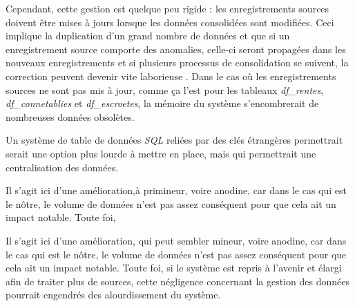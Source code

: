 Cependant, cette gestion est quelque peu rigide :  les enregistrements sources doivent être mises à jours lorsque les données consolidées sont modifiées. Ceci implique la duplication d'un grand nombre de données et que si un enregistrement source comporte des anomalies, celle-ci seront propagées dans les nouveaux enregistrements et si plusieurs processus de consolidation se suivent,  la correction peuvent devenir vite laborieuse \parencite{boydens_qualite_2021}. Dans le cas où  les enregistrements sources ne sont pas mis à jour, comme ça l'est pour les tableaux  \textit{df\_rentes}, \textit{df\_connetablies} et \textit{df\_escroetes}, la mémoire du système s'encombrerait de nombreuses données obsolètes.

Un système de table de données \textit{SQL}  reliées par des clés étrangères permettrait serait une option plus lourde à mettre en place, mais qui permettrait une centralisation des données. 

Il s'agit ici d'une amélioration,à primineur, voire anodine, car dans le cas qui est le nôtre, le volume de données n'est pas assez conséquent pour que cela ait un impact notable. Toute foi, 

Il s'agit ici d'une amélioration, qui peut sembler mineur, voire anodine, car dans le cas qui est le nôtre, le volume de données n'est pas assez conséquent pour que cela ait un impact notable. Toute foi, si le système est repris à l'avenir et élargi afin de traiter plus de sources, cette négligence concernant la gestion des données pourrait engendrés des alourdissement du système.

